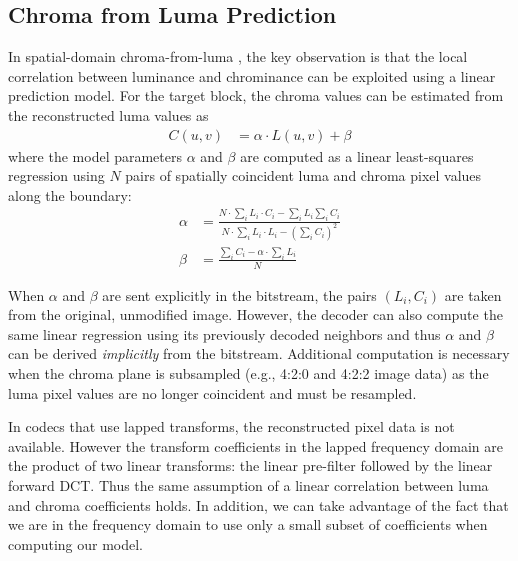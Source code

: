 \documentclass[conference, 10pt]{IEEEtran}
\begin{document}
\subsection{Chroma from Luma Prediction}
\label{sec:cfl}

In spatial-domain chroma-from-luma \cite{JCTVCB021}, the key observation is that the local
 correlation between luminance and chrominance can be exploited using a linear
 prediction model.
For the target block, the chroma values can be estimated from the reconstructed
 luma values as
\begin{align}
C(u,v) & = \alpha\cdot L(u,v) + \beta
\end{align}
where the model parameters $\alpha$ and $\beta$ are computed as a linear
 least-squares regression using $N$ pairs of spatially coincident luma and
 chroma pixel values along the boundary:
\begin{align}
\alpha & = \frac{N\cdot\displaystyle\sum_i L_i\cdot C_i - \displaystyle\sum_i L_i\displaystyle\sum_i C_i}{N\cdot\displaystyle\sum_i L_i\cdot L_i - \left(\displaystyle\sum_i C_i\right)^2} \\
\beta & = \frac{\displaystyle\sum_i C_i -\alpha\cdot\displaystyle\sum_i L_i}{N}
\label{eqn:fit}
\end{align}

When $\alpha$ and $\beta$ are sent explicitly in the bitstream, the pairs
 $(L_i,C_i)$ are taken from the original, unmodified image.
However, the decoder can also compute the same linear regression using its
 previously decoded neighbors and thus $\alpha$ and $\beta$ can be
 derived {\em implicitly} from the bitstream.
Additional computation is necessary when the chroma plane is subsampled (e.g.,
 4:2:0 and 4:2:2 image data) as the luma pixel values are no longer coincident
 and must be resampled.

In codecs that use lapped transforms, the reconstructed pixel data is not
 available.
However the transform coefficients in the lapped frequency domain are the
 product of two linear transforms: the linear pre-filter followed by the linear
 forward DCT.
Thus the same assumption of a linear correlation between luma and chroma
 coefficients holds.
In addition, we can take advantage of the fact that we are in the frequency
 domain to use only a small subset of coefficients when computing our model.
\end{document}
